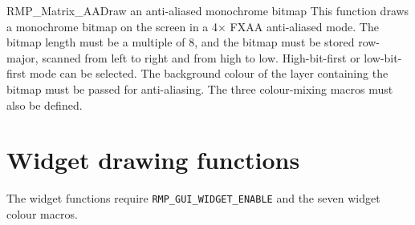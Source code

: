 \begin{apidesc}{RMP\_Matrix\_AA}{Draw an anti-aliased monochrome bitmap}\label{api:RMP_Matrix_AA}
    This function draws a monochrome bitmap on the screen in a 4$\times$ FXAA anti-aliased mode.
    The bitmap length must be a multiple of 8, and the bitmap must be stored row-major, scanned from left to right and from high to low.
    High-bit-first or low-bit-first mode can be selected.
    The background colour of the layer containing the bitmap must be passed for anti-aliasing.
    The three colour-mixing macros must also be defined.
    \begin{apiparams}
    \end{apiparams}
    \begin{apiret}
    \end{apiret}
\end{apidesc}

\section{Widget drawing functions}

The widget functions require \texttt{RMP\_GUI\_WIDGET\_ENABLE} and the seven widget colour macros.

